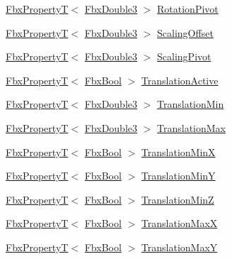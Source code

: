 \begin{Indent}
\begin{DoxyCompactItemize}
\item 
\hyperlink{class_fbx_property_t}{Fbx\+PropertyT}$<$ \hyperlink{fbxtypes_8h_ae0a96f14cde566774c7553aa7523b7a7}{Fbx\+Double3} $>$ \hyperlink{class_fbx_node_ad9175d66436673534fda8fa58d457e01}{Rotation\+Pivot}
\item 
\hyperlink{class_fbx_property_t}{Fbx\+PropertyT}$<$ \hyperlink{fbxtypes_8h_ae0a96f14cde566774c7553aa7523b7a7}{Fbx\+Double3} $>$ \hyperlink{class_fbx_node_a8f1fe91e72b9e34f981b153140cc35de}{Scaling\+Offset}
\item 
\hyperlink{class_fbx_property_t}{Fbx\+PropertyT}$<$ \hyperlink{fbxtypes_8h_ae0a96f14cde566774c7553aa7523b7a7}{Fbx\+Double3} $>$ \hyperlink{class_fbx_node_ab7f341494efcbee371d417a9bf19d040}{Scaling\+Pivot}
\item 
\hyperlink{class_fbx_property_t}{Fbx\+PropertyT}$<$ \hyperlink{fbxtypes_8h_a92e0562b2fe33e76a242f498b362262e}{Fbx\+Bool} $>$ \hyperlink{class_fbx_node_acf5cb5425a24d6e99b19085b93585fcd}{Translation\+Active}
\item 
\hyperlink{class_fbx_property_t}{Fbx\+PropertyT}$<$ \hyperlink{fbxtypes_8h_ae0a96f14cde566774c7553aa7523b7a7}{Fbx\+Double3} $>$ \hyperlink{class_fbx_node_aaaa913d4332c2136f50ae15356521413}{Translation\+Min}
\item 
\hyperlink{class_fbx_property_t}{Fbx\+PropertyT}$<$ \hyperlink{fbxtypes_8h_ae0a96f14cde566774c7553aa7523b7a7}{Fbx\+Double3} $>$ \hyperlink{class_fbx_node_ad5867ca599b10137c3caf2eb102eaff7}{Translation\+Max}
\item 
\hyperlink{class_fbx_property_t}{Fbx\+PropertyT}$<$ \hyperlink{fbxtypes_8h_a92e0562b2fe33e76a242f498b362262e}{Fbx\+Bool} $>$ \hyperlink{class_fbx_node_a8ffb0049319dbb88db7c0536b4c97339}{Translation\+MinX}
\item 
\hyperlink{class_fbx_property_t}{Fbx\+PropertyT}$<$ \hyperlink{fbxtypes_8h_a92e0562b2fe33e76a242f498b362262e}{Fbx\+Bool} $>$ \hyperlink{class_fbx_node_a61c15c2ecc1e454320759c68e95e44b3}{Translation\+MinY}
\item 
\hyperlink{class_fbx_property_t}{Fbx\+PropertyT}$<$ \hyperlink{fbxtypes_8h_a92e0562b2fe33e76a242f498b362262e}{Fbx\+Bool} $>$ \hyperlink{class_fbx_node_a0e89c2861ae7bb58014dd0f4ffe069be}{Translation\+MinZ}
\item 
\hyperlink{class_fbx_property_t}{Fbx\+PropertyT}$<$ \hyperlink{fbxtypes_8h_a92e0562b2fe33e76a242f498b362262e}{Fbx\+Bool} $>$ \hyperlink{class_fbx_node_a07a5df097d43dc3069669a448b3b8179}{Translation\+MaxX}
\item 
\hyperlink{class_fbx_property_t}{Fbx\+PropertyT}$<$ \hyperlink{fbxtypes_8h_a92e0562b2fe33e76a242f498b362262e}{Fbx\+Bool} $>$ \hyperlink{class_fbx_node_a68ce7c657e10023ec08fc70461a3624e}{Translation\+MaxY}

\end{DoxyCompactItemize}
\end{Indent}
